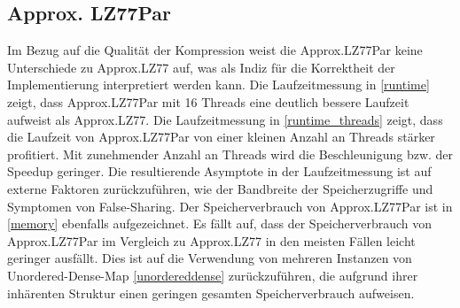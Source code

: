 \subsection{Approx. LZ77Par}
Im Bezug auf die Qualität der Kompression weist die Approx.LZ77Par keine Unterschiede zu Approx.LZ77 auf, was als Indiz für die Korrektheit der Implementierung
interpretiert werden kann. Die Laufzeitmessung in \ref{runtime} zeigt, dass Approx.LZ77Par mit 16 Threads eine deutlich bessere Laufzeit aufweist als Approx.LZ77.
Die Laufzeitmessung in \ref{runtime_threads} zeigt, dass die Laufzeit von Approx.LZ77Par von einer kleinen Anzahl an Threads stärker profitiert. Mit zunehmender 
Anzahl an Threads wird die Beschleunigung bzw. der Speedup geringer. Die resultierende Asymptote in der Laufzeitmessung ist auf externe Faktoren zurückzuführen,
wie der Bandbreite der Speicherzugriffe und Symptomen von False-Sharing. Der Speicherverbrauch von Approx.LZ77Par ist in \ref{memory} ebenfalls aufgezeichnet.
Es fällt auf, dass der Speicherverbrauch von Approx.LZ77Par im Vergleich zu Approx.LZ77 in den meisten Fällen leicht geringer ausfällt. 
Dies ist auf die Verwendung von mehreren Instanzen von Unordered-Dense-Map \ref{unordereddense} zurückzuführen, die aufgrund ihrer inhärenten Struktur einen 
geringen gesamten Speicherverbrauch aufweisen.
